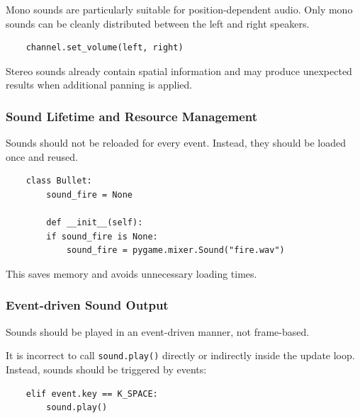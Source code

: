 Mono sounds are particularly suitable for position-dependent audio. Only mono sounds can be cleanly distributed between the left and right speakers.

\lstset{firstnumber=1}
\begin{lstlisting}
	channel.set_volume(left, right)
\end{lstlisting}

\begin{warningbox}[Don'ts]
	Stereo sounds already contain spatial information and may produce unexpected results when additional panning is applied.
\end{warningbox}

\newpage
\subsubsection{Sound Lifetime and Resource Management}

\begin{hintbox}
	Sounds should not be reloaded for every event. Instead, they should be loaded once and reused.
\end{hintbox}

\lstset{firstnumber=1}
\begin{lstlisting}
	class Bullet:
		sound_fire = None
	
		def __init__(self):
		if sound_fire is None:
			sound_fire = pygame.mixer.Sound("fire.wav")
\end{lstlisting}


This saves memory and avoids unnecessary loading times.

\subsubsection{Event-driven Sound Output}
\begin{hintbox}
	Sounds should be played in an event-driven manner, not frame-based.
\end{hintbox}

It is incorrect to call \texttt{sound.play()} directly or indirectly inside the update loop. Instead, sounds should be triggered by events:

\lstset{firstnumber=1}
\begin{lstlisting}
	elif event.key == K_SPACE:
		sound.play()
\end{lstlisting}


